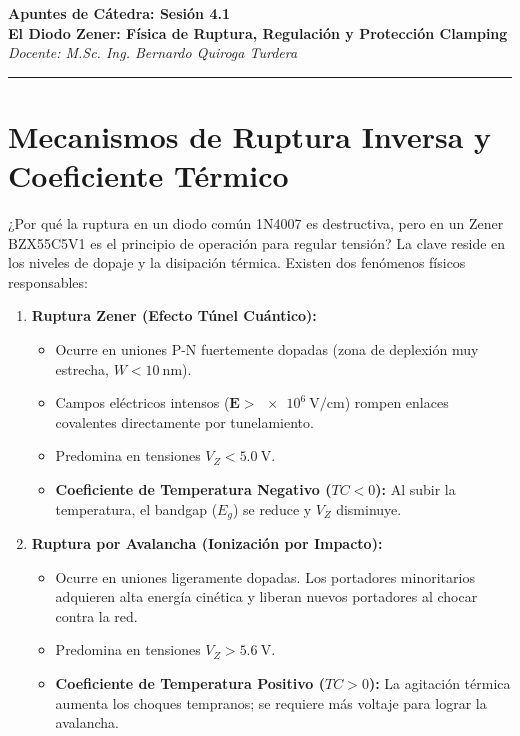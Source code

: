 \documentclass[11pt, a4paper]{article}
\begin{document}
\begin{center}
    {\LARGE \textbf{Apuntes de Cátedra: Sesión 4.1}}\\[0.3cm]
    {\large \textbf{El Diodo Zener: Física de Ruptura, Regulación y Protección Clamping}}\\
    \textit{Docente: M.Sc. Ing. Bernardo Quiroga Turdera}
    \vspace{0.3cm}
    \hrule
\end{center}

\vspace{0.3cm}

\section{Mecanismos de Ruptura Inversa y Coeficiente Térmico}
¿Por qué la ruptura en un diodo común 1N4007 es destructiva, pero en un Zener BZX55C5V1 es el principio de operación para regular tensión? La clave reside en los niveles de dopaje y la disipación térmica. Existen dos fenómenos físicos responsables:

\begin{enumerate}
    \item \textbf{Ruptura Zener (Efecto Túnel Cuántico):}
    \begin{itemize}
        \item Ocurre en uniones P-N fuertemente dopadas (zona de deplexión muy estrecha, $W < \qty{10}{\nano\meter}$).
        \item Campos eléctricos intensos ($\mathbf{E} > \qty{e6}{\volt\per\centi\meter}$) rompen enlaces covalentes directamente por tunelamiento.
        \item Predomina en tensiones $V_Z < \qty{5.0}{\volt}$.
        \item \textbf{Coeficiente de Temperatura Negativo ($TC < 0$):} Al subir la temperatura, el bandgap ($E_g$) se reduce y $V_Z$ disminuye.
    \end{itemize}
    \item \textbf{Ruptura por Avalancha (Ionización por Impacto):}
    \begin{itemize}
        \item Ocurre en uniones ligeramente dopadas. Los portadores minoritarios adquieren alta energía cinética y liberan nuevos portadores al chocar contra la red.
        \item Predomina en tensiones $V_Z > \qty{5.6}{\volt}$.
        \item \textbf{Coeficiente de Temperatura Positivo ($TC > 0$):} La agitación térmica aumenta los choques tempranos; se requiere más voltaje para lograr la avalancha.
    \end{itemize}
\end{enumerate}
\end{document}
